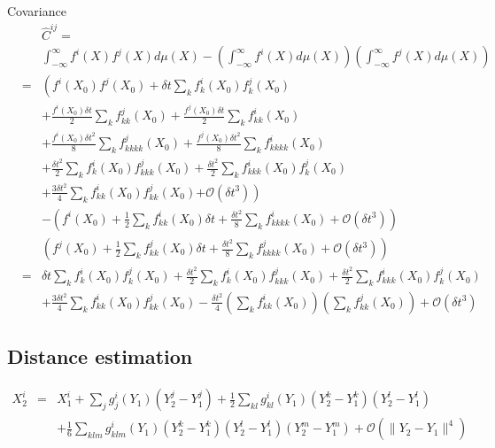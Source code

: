 \documentclass[12pt]{article}
\begin{document}
Covariance
\begin{eqnarray}
&& \hat{C}^{ij} = \\ 
&& \int_{-\infty}^{\infty} f^i(X) f^j(X) d\mu(X) - \left(\int_{-\infty}^{\infty} f^i(X) d\mu(X) \right) \left(\int_{-\infty}^{\infty} f^j(X) d\mu(X) \right) \\
&=& \left( f^i(X_0) f^j(X_0) 
 + \delta t \sum_k f^i_k(X_0)  f^j_k(X_0) \right.   \\
&&  + \frac{f^i(X_0) \delta t}{2} \sum_{k} f^j_{kk}(X_0)
+ \frac{f^j(X_0) \delta t}{2} \sum_{k} f^i_{kk}(X_0)  \\
&&+ \frac{f^i(X_0) \delta t^2}{8} \sum_{k} f^j_{kkkk} (X_0) 
+ \frac{f^j(X_0) \delta t^2}{8} \sum_{k} f^i_{kkkk} (X_0)\\
&& + \frac{\delta t^2}{2} \sum_k f^i_k(X_0) f^j_{kkk} (X_0)  
 + \frac{\delta t^2}{2} \sum_k f^i_{kkk} (X_0) f^j_k(X_0) \\
&&+  \frac{3  \delta t^2}{4} \sum_{k} f^i_{kk}(X_0) f^j_{kk}(X_0) 
 \left.+ \mathcal{O}\left( \delta t^3 \right) \right) \\
&&- \left( f^i(X_0) + \frac{1}{2} \sum_k f^i_{kk}(X_0) \delta t + \frac{\delta t^2}{8} \sum_{k} f^i_{kkkk} (X_0) + \mathcal{O} (\delta t^3 ) \right) \\
&&\left( f^j(X_0) + \frac{1}{2} \sum_k f^j_{kk}(X_0) \delta t + \frac{\delta t^2}{8} \sum_{k} f^j_{kkkk} (X_0) + \mathcal{O} (\delta t^3 ) \right) \\
&=&
\delta t \sum_k f^i_k(X_0)  f^j_k(X_0) 
+ \frac{\delta t^2}{2} \sum_k f^i_k(X_0) f^j_{kkk} (X_0)  
 + \frac{\delta t^2}{2} \sum_k f^i_{kkk} (X_0) f^j_k(X_0) \\
&&+  \frac{3 \delta t^2}{4} \sum_{k} f^i_{kk}(X_0) f^j_{kk}(X_0) 
- \frac{\delta t^2}{4} \left( \sum_k f^i_{kk}(X_0) \right) \left( \sum_k f^j_{kk}(X_0) \right) 
 + \mathcal{O}\left( \delta t^3 \right) 
\end{eqnarray}

\subsection{Distance estimation}

\begin{eqnarray}
X_2^i &=& X_1^i + \sum_j g_j^i (Y_1) (Y^j_2 - Y^j_1 ) 
+ \frac{1}{2} \sum_{kl}  g^i_{kl} (Y_1) (Y^k_2 - Y^k_1)(Y^l_2 - Y^l_1) \\
&&+ \frac{1}{6} \sum_{klm}  g^i_{klm} (Y_1) (Y^k_2 - Y^k_1)(Y^l_2 - Y^l_1) (Y^m_2 - Y^m_1) 
+ \mathcal{O}( \|Y_2 - Y_1\|^4 )
\end{eqnarray}
\end{document}
